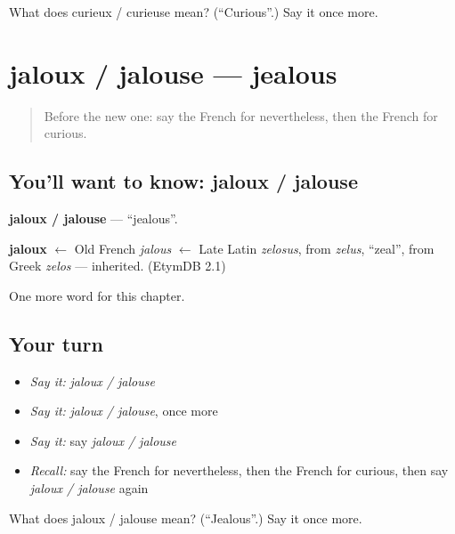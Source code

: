 \begin{tcolorbox}[breakable,colback=teal!4,colframe=teal!35!black,title={Before you move on}]
What does curieux / curieuse mean? (\textquotedblleft{}Curious\textquotedblright{}.) Say it once more.
\end{tcolorbox}
\section[jaloux / jalouse]{jaloux / jalouse — jealous}

\label{lesson:FR-C218-jaloux-jalouse}



\begin{quote}
Before the new one: say the French for nevertheless, then the French for curious.
\end{quote}

\subsection*{You'll want to know: jaloux / jalouse}
\textbf{jaloux / jalouse} — \textquotedblleft{}jealous\textquotedblright{}.

\begin{cousinweb}
\textbf{jaloux} $\leftarrow$ Old French \emph{jalous} $\leftarrow$ Late Latin \emph{zelosus}, from \emph{zelus}, \textquotedblleft{}zeal\textquotedblright{}, from Greek \emph{zelos} — inherited. (EtymDB 2.1)
\end{cousinweb}

\begin{grammarlens}[title={What you've built}]
One more word for this chapter.
\end{grammarlens}

\subsection*{Your turn}
\begin{itemize}
\raggedright
  \item \emph{Say it:} \emph{jaloux / jalouse}
  \item \emph{Say it:} \emph{jaloux / jalouse}, once more
  \item \emph{Say it:} say \emph{jaloux / jalouse}
  \item \emph{Recall:} say the French for nevertheless, then the French for curious, then say \emph{jaloux / jalouse} again
\end{itemize}

\begin{tcolorbox}[breakable,colback=teal!4,colframe=teal!35!black,title={Before you move on}]
What does jaloux / jalouse mean? (\textquotedblleft{}Jealous\textquotedblright{}.) Say it once more.
\end{tcolorbox}
